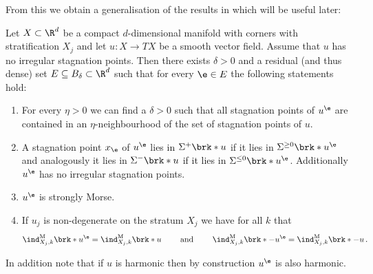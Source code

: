 \newpage From this we obtain
a generalisation of the results in \cite[§2]{Morse1970} which will be useful later:
\begin{corollary}\label{co:density_boundaryGeneric}
  Let $X\subset\R^d$ be a compact $d$-dimensional manifold with corners with stratification $X_j$ and let $u\colon X\to TX$ be a smooth vector field.
  Assume that $u$ has no irregular stagnation points.
  Then there exists $\delta>0$ and a residual (and thus dense) set $E\subseteq B_\delta\subset\R^d$ such that for every $\e\in E$
  the following statements hold:
  \begin{enumerate}
    \item For every $\eta>0$ we can find a $\delta>0$ such that all stagnation points of $u^\e$ are contained in an 
    $\eta$-neighbourhood of the set of stagnation points of $u$.\label{co:nonDegeneracy_density_etaNbh}
    \item A stagnation point $x_\e$ of $u^\e$ lies in $\Sigma^+\brk*{u}$ if it lies in $\Sigma^{\geq0}\brk*{u^\e}$ 
      and analogously it lies in $\Sigma^-\brk*{u}$ if it lies in $\Sigma^{\leq0}\brk*{u^\e}$. Additionally $u^\e$ has no
      irregular stagnation points.
      \label{co:nonDegeneracy_density_entrEmerg}
    \item $u^\e$ is strongly Morse. \label{co:nonDegeneracy_density_nonDeg}
    \item If $u_j$ is non-degenerate on the stratum $X_j$ we have\label{co:nonDegeneracy_density_index}
    for all $k$ that
    \begin{align*}
      \ind^\text{M}_{X_j,k}\brk*{u^\e}=\ind^\text{M}_{X_j,k}\brk*{u}\qquad\text{ and }\qquad\ind^\text{M}_{X_j,k}\brk*{-u^\e}=\ind^\text{M}_{X_j,k}\brk*{-u}\,.
    \end{align*}
  \end{enumerate}
  In addition note that if $u$ is harmonic then by construction $u^\e$ is also harmonic.
\end{corollary}
